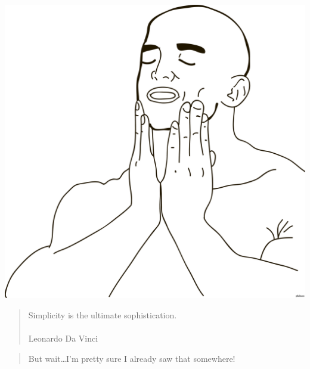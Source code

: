 \begin{frame}[fragile,c]
    \begin{center}
        \includegraphics[height=\textheight]{src/session--composition-and-inheritance/meme/feels-good.png}
    \end{center}
\end{frame}

\begin{frame}
    \begin{quote}
        Simplicity is the ultimate sophistication.\\~\\

        \hfill Leonardo Da Vinci
    \end{quote}
\end{frame}

\begin{frame}
    \begin{quote}
        But wait\ldots \pause I'm pretty sure I already saw that somewhere!
    \end{quote}
\end{frame}

